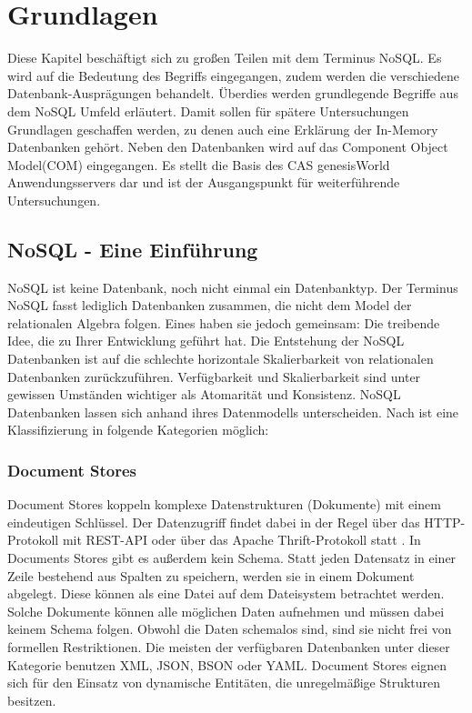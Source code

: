 
\chapter{Grundlagen}
\label{ch:grundlagen}

Diese Kapitel beschäftigt sich zu großen Teilen mit dem Terminus NoSQL. Es wird auf die Bedeutung des Begriffs eingegangen, zudem werden die verschiedene Datenbank-Ausprägungen behandelt. Überdies werden grundlegende Begriffe aus dem NoSQL Umfeld erläutert. Damit sollen für spätere Untersuchungen Grundlagen geschaffen werden, zu denen auch eine Erklärung der In-Memory Datenbanken gehört. Neben den Datenbanken wird auf das Component Object Model(COM) eingegangen. Es stellt die Basis des CAS genesisWorld Anwendungsservers dar und ist der Ausgangspunkt für weiterführende Untersuchungen.

\section{NoSQL - Eine Einführung}
\label{ch:grundlagen:sec:NoSQL}

NoSQL ist keine Datenbank, noch nicht einmal ein Datenbanktyp. Der Terminus NoSQL fasst lediglich Datenbanken zusammen, die nicht dem Model der relationalen Algebra folgen. Eines haben sie jedoch gemeinsam: Die treibende Idee, die zu Ihrer Entwicklung geführt hat. Die Entstehung der NoSQL Datenbanken ist auf die schlechte horizontale Skalierbarkeit von relationalen Datenbanken zurückzuführen. Verfügbarkeit und Skalierbarkeit sind unter gewissen Umständen wichtiger als Atomarität und Konsistenz. NoSQL Datenbanken lassen sich anhand ihres Datenmodells unterscheiden. Nach \cite{vaish2013getting} ist eine Klassifizierung in folgende Kategorien möglich:

\subsection{Document Stores}
\label{ch:grundlagen:sec:NoSQL:DocumentStores}

Document Stores koppeln komplexe Datenstrukturen (Dokumente) mit einem eindeutigen Schlüssel. Der Datenzugriff findet dabei in der Regel über das HTTP-Protokoll mit REST-API oder über das Apache Thrift-Protokoll statt \cite{agarwal2007thrift}. In Documents Stores gibt es außerdem kein Schema. Statt jeden Datensatz in einer Zeile bestehend aus Spalten zu speichern, werden sie in einem Dokument abgelegt. Diese können als eine Datei auf dem Dateisystem betrachtet werden. Solche Dokumente können alle möglichen Daten aufnehmen und müssen dabei keinem Schema folgen. Obwohl die Daten schemalos sind, sind sie nicht frei von formellen Restriktionen. Die meisten der verfügbaren Datenbanken unter dieser Kategorie benutzen XML, JSON, BSON oder YAML. Document Stores eignen sich für den Einsatz von dynamische Entitäten, die unregelmäßige Strukturen besitzen.

